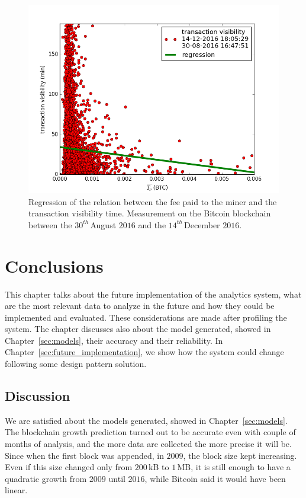 \documentclass[USenglish]{uit-thesis}
\begin{document}
\begin{figure}[h]
	\centering
	\includegraphics[width=1\textwidth]{img/transaction_fee_bandwidth}
	\caption{Regression of the relation between the fee paid
		to the miner and the transaction visibility time.
		Measurement on the Bitcoin blockchain between
		the $30^{th}$\,August $2016$ and the
		$14^{th}$\,December $2016$.}
	\label{fig:transaction_fee_bandwidth}
\end{figure}

\chapter{Conclusions}
\label{chap:conclusion}
This chapter talks about the future implementation of the analytics system, what are
the most relevant data to analyze in the future and how they could be implemented
and evaluated.
These considerations are made after profiling the system. The chapter discusses also
about the model generated,  showed
in Chapter~\ref{sec:models}, their accuracy and their reliability.
In Chapter~\ref{sec:future_implementation}, we 
show how the system could change following some design pattern solution.

\section{Discussion}
\label{sec:discussion}
We are satisfied about the models generated, showed in Chapter~\ref{sec:models}.
The blockchain growth prediction turned out to be accurate even with couple
of months of analysis, and the more data are collected the more precise it will be.
Since when the first block was appended, in $2009$, the block size kept increasing. Even if this
size changed only from $200$\,kB to $1$\,MB, it is still enough to have a quadratic growth from
$2009$ until $2016$, while Bitcoin said it would have been linear.
\end{document}
